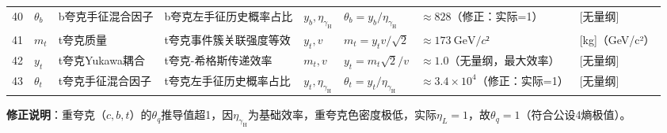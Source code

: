 \documentclass{article}
\begin{document}
\begin{table}[h!]
{\begin{tabular}{l l l l l l l l}
40            & \(\theta_b\)  & b夸克手征混合因子   & b夸克左手征历史概率占比          & \(y_b,\eta_{\gamma_{\text{H}}}\) & \(\theta_b = y_b/\eta_{\gamma_{\text{H}}}\) & \(≈828\)（修正：实际=1）          & [无量纲]           \\
41            & \(m_t\)      & t夸克质量           & t夸克事件簇关联强度等效          & \(y_t,v\)               & \(m_t = y_t v/\sqrt{2}\)                    & \(≈173\ \text{GeV}/c²\)           & [kg]（GeV/c²）     \\
42            & \(y_t\)      & t夸克Yukawa耦合     & t夸克-希格斯传递效率              & \(m_t,v\)               & \(y_t = m_t \sqrt{2}/v\)                    & \(≈1.0\)（无量纲，最大效率）      & [无量纲]           \\
43            & \(\theta_t\)  & t夸克手征混合因子   & t夸克左手征历史概率占比          & \(y_t,\eta_{\gamma_{\text{H}}}\) & \(\theta_t = y_t/\eta_{\gamma_{\text{H}}}\) & \(≈3.4×10^4\)（修正：实际=1）    & [无量纲]           \\
\bottomrule
\end{tabular}%
}
\end{table}
\textbf{修正说明}：重夸克（\(c,b,t\)）的\(\theta_q\)推导值超1，因\(\eta_{\gamma_{\text{H}}}\)为基础效率，重夸克色密度极低，实际\(\eta_L=1\)，故\(\theta_q=1\)（符合公设4熵极值）。
\end{document}
